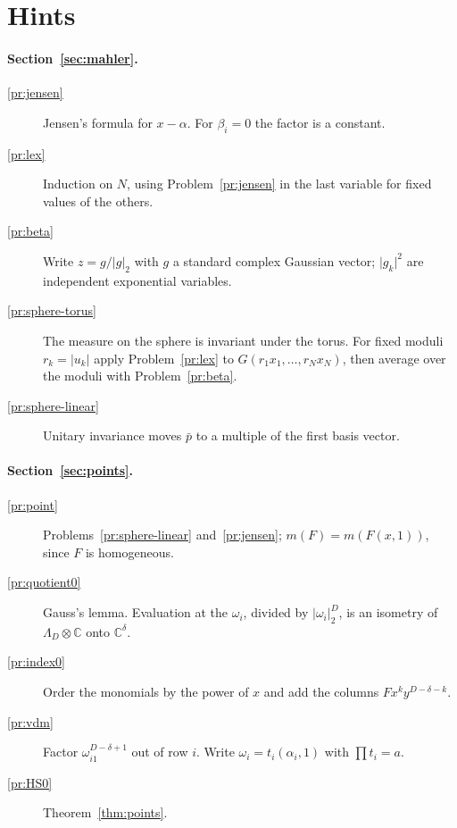 \documentclass[reqno]{amsart}
\theoremstyle{definition}
\theoremstyle{plain}
\newcommand{\C}{\mathbb{C}}
\begin{document}
\section*{Hints}
\paragraph{Section~\ref{sec:mahler}.}
\begin{description}
\item[\ref{pr:jensen}] Jensen's formula for \(x - \alpha\).  For \(\beta_i = 0\) the factor is a constant.
\item[\ref{pr:lex}] Induction on \(N\), using Problem~\ref{pr:jensen} in the last variable for fixed values of the others.
\item[\ref{pr:beta}] Write \(z = g/\lvert g \rvert_2\) with \(g\) a standard complex Gaussian vector; \(\lvert g_k \rvert^2\) are independent exponential variables.
\item[\ref{pr:sphere-torus}] The measure on the sphere is invariant under the torus.  For fixed moduli \(r_k = \lvert u_k \rvert\) apply Problem~\ref{pr:lex} to \(G(r_1x_1, \dots, r_Nx_N)\), then average over the moduli with Problem~\ref{pr:beta}.
\item[\ref{pr:sphere-linear}] Unitary invariance moves \(\bar p\) to a multiple of the first basis vector.
\end{description}
\paragraph{Section~\ref{sec:points}.}
\begin{description}
\item[\ref{pr:point}] Problems~\ref{pr:sphere-linear} and~\ref{pr:jensen}; \(m(F) = m(F(x,1))\), since \(F\) is homogeneous.
\item[\ref{pr:quotient0}] Gauss's lemma.  Evaluation at the \(\omega_i\), divided by \(\lvert\omega_i\rvert_2^D\), is an isometry of \(\Lambda_D \otimes \C\) onto \(\C^\delta\).
\item[\ref{pr:index0}] Order the monomials by the power of \(x\) and add the columns \(F x^k y^{D-\delta-k}\).
\item[\ref{pr:vdm}] Factor \(\omega_{i1}^{D-\delta+1}\) out of row \(i\).  Write \(\omega_i = t_i(\alpha_i, 1)\) with \(\prod t_i = a\).
\item[\ref{pr:HS0}] Theorem~\ref{thm:points}.
\end{description}
\end{document}
